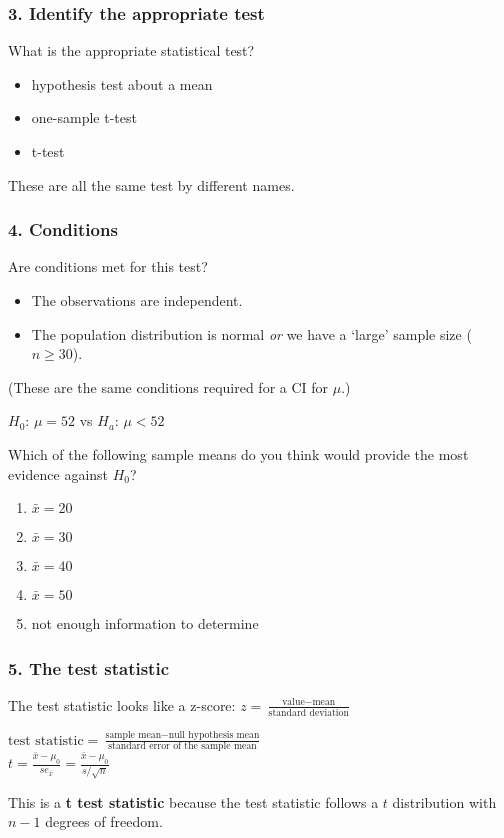 \begin{frame}
\frametitle{3. Identify the appropriate test}
What is the appropriate statistical test?
\begin{itemize}
    \item
    hypothesis test about a mean
    \item
    one-sample t-test
    \item
    t-test
\end{itemize}
These are all the same test by different names.
\end{frame}


\begin{frame}
\frametitle{4. Conditions}
Are conditions met for this test?
\begin{itemize}
       \item
        The observations are independent.
        \item
        The population distribution is normal \emph{or} we have a `large' sample size ($n\geq 30$).
    \end{itemize}
    \vskip10pt
(These are the same conditions required for a CI for $\mu$.)
\end{frame}

\begin{frame}
$H_0$: $\mu=52$ vs $H_a$: $\mu < 52$\\
\begin{clicker}{Which of the following sample means do you think would provide the most evidence against $H_0$?}
\begin{enumerate}
    \item
    $\bar{x}=20$
    \item
    $\bar{x}=30$
    \item
    $\bar{x}=40$
    \item
    $\bar{x}=50$
    \item
    not enough information to determine
\end{enumerate}
\end{clicker}
\end{frame}


\begin{frame}
\frametitle{5. The test statistic}
The test statistic looks like a z-score: $\displaystyle z=\frac{\mbox{value}-\mbox{mean}}{\mbox{standard deviation}}$
\vskip15pt
\begin{center}
$\displaystyle \mbox{test statistic} = \frac{\mbox{sample mean}-\mbox{null hypothesis mean}}{\mbox{standard error of the sample mean}}$\\
\vskip10pt
$\displaystyle t = \frac{\bar{x}-\mu_0}{se_{\bar{x}}}=\frac{\bar{x}-\mu_0}{s/\sqrt{n}}$
\end{center}
\vskip15pt
This is a \textbf{t test statistic} because the test statistic follows a $t$ distribution with $n-1$ degrees of freedom.
\end{frame}



